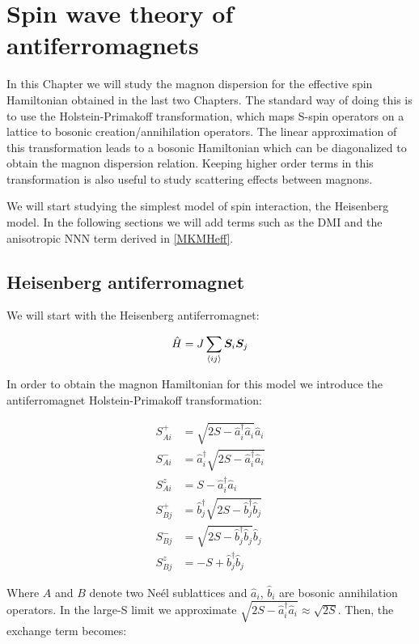 \chapter{Spin wave theory of antiferromagnets}
\label{SpinWave}

In this Chapter we will study the magnon dispersion for the effective spin Hamiltonian obtained in the last two Chapters. The standard way of doing this is to use the Holstein-Primakoff transformation, which maps S-spin operators on a lattice to bosonic creation/annihilation operators. The linear approximation of this transformation leads to a bosonic Hamiltonian which can be diagonalized to obtain the magnon dispersion relation. Keeping higher order terms in this transformation is also useful to study scattering effects between magnons.

We will start studying the simplest model of spin interaction, the Heisenberg model. In the following sections we will add terms such as the DMI and the anisotropic NNN term derived in \ref{MKMHeff}.

\section{Heisenberg antiferromagnet}

We will start with the Heisenberg antiferromagnet:

\begin{equation}
\hat{H} = J \sum_{\langle i j \rangle} \boldsymbol{S}_i \boldsymbol{S}_j
\end{equation}

In order to obtain the magnon Hamiltonian for this model we introduce the antiferromagnet Holstein-Primakoff transformation:

\begin{align}
S^+_{Ai} &= \sqrt{2S-\hat{a}^\dagger_i \hat{a}_i} \hat{a}_i \\
S^-_{Ai} &= \hat{a}^\dagger_i\sqrt{2S-\hat{a}^\dagger_i \hat{a}_i}  \\
S^z_{Ai} &= S - \hat{a}^\dagger_i \hat{a}_i \\
S^+_{Bj} &=\hat{b}^\dagger_j\sqrt{2S-\hat{b}^\dagger_j \hat{b}_j} \\
S^-_{Bj} &= \sqrt{2S-\hat{b}^\dagger_j \hat{b}_j} \hat{b}_j \\
S^z_{Bj} &= -S + \hat{b}^\dagger_j \hat{b}_j
\end{align}

Where $A$ and $B$ denote two Ne\'{e}l sublattices and $\hat{a}_i$, $\hat{b}_i$ are bosonic annihilation operators. In the large-S limit we approximate $ \sqrt{2S-\hat{a}^\dagger_i \hat{a}_i} \approx \sqrt{2S}$. Then, the exchange term becomes:

